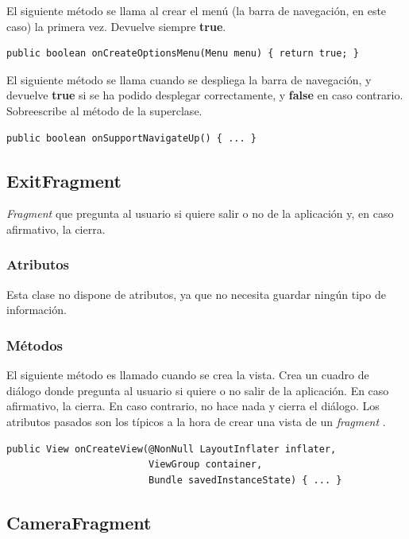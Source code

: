\documentclass[11pt,a4paper]{article}
\begin{document}
El siguiente método se llama al crear el menú (la barra de navegación, en este caso) la primera vez. Devuelve siempre \textbf{true}.

\begin{lstlisting}
public boolean onCreateOptionsMenu(Menu menu) { return true; }
\end{lstlisting}

El siguiente método se llama cuando se despliega la barra de navegación, y devuelve \textbf{true} si se ha podido desplegar
correctamente, y \textbf{false} en caso contrario. Sobreescribe al método de la superclase.

\begin{lstlisting}
public boolean onSupportNavigateUp() { ... }
\end{lstlisting}

\subsection{\textbf{ExitFragment}}
\label{sec:exit}

\textit{Fragment} que pregunta al usuario si quiere salir o no de la aplicación y, en caso afirmativo, la cierra.

\subsubsection{Atributos}

Esta clase no dispone de atributos, ya que no necesita guardar ningún tipo de información.

\subsubsection{Métodos}

El siguiente método es llamado cuando se crea la vista. Crea un cuadro de diálogo donde pregunta al usuario si quiere o no salir de la
aplicación. En caso afirmativo, la cierra. En caso contrario, no hace nada y cierra el diálogo. Los atributos pasados son los típicos
a la hora de crear una vista de un \textit{fragment} \cite{bib:fragment}.

\begin{lstlisting}
public View onCreateView(@NonNull LayoutInflater inflater,
                         ViewGroup container,
                         Bundle savedInstanceState) { ... }
\end{lstlisting}

\subsection{\textbf{CameraFragment}}
\label{sec:camera}
\end{document}
